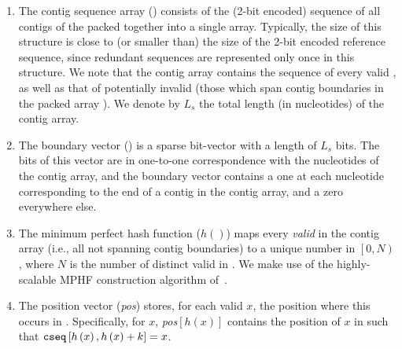 \begin{enumerate}

\item The contig sequence array (\cseq) consists of the (2-bit encoded) sequence of all
  contigs of the \ccdbg packed together into a single array. Typically, the size
  of this structure is close to (or smaller than) the size of the 2-bit encoded
  reference sequence, since redundant sequences are represented only once in
  this structure. We note that the contig array contains the sequence of every
  valid \kmer, as well as that of potentially invalid \kmers (those which span
  contig boundaries in the packed array ).  We denote by $L_s$ the total length (in
  nucleotides) of the contig array.

\item The boundary vector (\bv) is a sparse bit-vector with a length of $L_s$
  bits. The bits of this vector are in one-to-one correspondence with the
  nucleotides of the contig array, and the boundary vector contains a one at
  each nucleotide corresponding to the end of a contig in the contig array, and
  a zero everywhere else. 

\item The minimum perfect hash function ($h\left(\right)$) maps every
  \emph{valid} \kmer in the contig array (i.e., all \kmers not spanning contig
  boundaries) to a unique number in $\left[0,N\right)$, where $N$ is the number
    of distinct valid \kmers in \cseq. We make use of the highly-scalable MPHF
    construction algorithm of~\cite{limasset2017fast}.

\item The position vector (\emph{pos}) stores, for each valid \kmer $x$, the
  position where this \kmer occurs in \cseq. Specifically, for \kmer $x$,
  \emph{pos}$\left[h\left(x\right)\right]$ contains the  position of $x$ in \cseq 
  such that $\texttt{cseq}\left[h\left(x\right),h\left(x\right) + k\right] = x$.


\end{enumerate}
